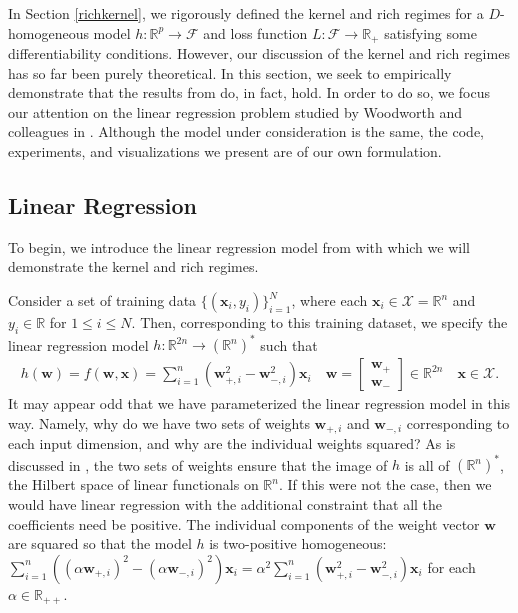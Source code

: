 \documentclass{article}
\begin{document}
In Section \ref{richkernel}, we rigorously defined the kernel and rich regimes for a $D$-homogeneous model $h: \mathbb{R}^p \rightarrow \mathcal{F}$ and loss function $L: \mathcal{F} \rightarrow \mathbb{R}_+$ satisfying some differentiability conditions. However, our discussion of the kernel and rich regimes has so far been purely theoretical. In this section, we seek to empirically demonstrate that the results from \cite{chizat2018lazy} do, in fact, hold. In order to do so, we focus our attention on the linear regression problem studied by Woodworth and colleagues in \cite{woodworth2020kernel}. Although the model under consideration is the same, the code, experiments, and visualizations we present are of our own formulation.

\subsection{Linear Regression}\label{linregmodel}

To begin, we introduce the linear regression model from \cite{woodworth2020kernel} with which we will demonstrate the kernel and rich regimes.

Consider a set of training data $\{ (\boldsymbol{x}_i, y_i)\}_{i=1}^N$, where each $\boldsymbol{x}_i \in \mathcal{X} = \mathbb{R}^n$ and $y_i \in \mathbb{R}$ for $1 \leq i \leq N$. Then, corresponding to this training dataset, we specify the linear regression model $h: \mathbb{R}^{2n} \rightarrow (\mathbb{R}^n)^*$ such that
\begin{align}\label{linreg}
    h(\boldsymbol{w}) = f(\boldsymbol{w}, \boldsymbol{x}) = \sum_{i=1}^n(\boldsymbol{w}_{+, i}^2 - \boldsymbol{w}_{-, i}^2)\boldsymbol{x}_i \quad 
    \boldsymbol{w} = 
    \begin{bmatrix}
        \boldsymbol{w}_+ \\
        \boldsymbol{w}_-
    \end{bmatrix} 
    \in \mathbb{R}^{2n} \quad \boldsymbol{x} \in \mathcal{X}.
\end{align}
It may appear odd that we have parameterized the linear regression model in this way. Namely, why do we have two sets of weights $\boldsymbol{w}_{+, i}$ and $\boldsymbol{w}_{-, i}$ corresponding to each input dimension, and why are the individual weights squared? As is discussed in \cite{woodworth2020kernel}, the two sets of weights ensure that the image of $h$ is all of $(\mathbb{R}^n)^*$, the Hilbert space of linear functionals on $\mathbb{R}^n$. If this were not the case, then we would have linear regression with the additional constraint that all the coefficients need be positive. The individual components of the weight vector $\boldsymbol{w}$ are squared so that the model $h$ is two-positive homogeneous: $\sum_{i=1}^n((\alpha \boldsymbol{w}_{+, i})^2 - (\alpha \boldsymbol{w}_{-, i})^2)\boldsymbol{x}_i = \alpha^2\sum_{i=1}^n(\boldsymbol{w}_{+, i}^2 - \boldsymbol{w}_{-, i}^2)\boldsymbol{x}_i$ for each $\alpha \in \mathbb{R}_{++}$.
\end{document}

